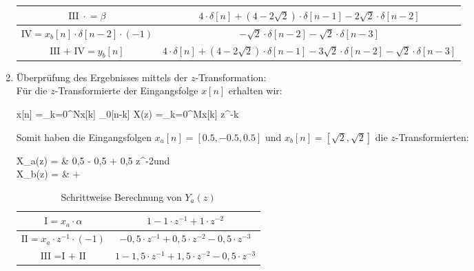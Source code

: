 \begin{enumerate}[label=\alph*)]
\begin{table}[H]
\begin{tabular}{|c|c|}
			\hline
			\ccgray $\mathrm{III} \;\cdot\! =\beta$							& $4 \cdot \delta[n] + \left(4-2\sqrt{2}\right) \cdot \delta[n-1] - 2\sqrt{2} \cdot \delta[n-2]$ \\
			\hline
			\ccgray $\mathrm{IV} =x_b[n] \cdot \delta[n-2] \cdot{(-1)}$	& $- \sqrt{2} \cdot \delta[n-2] - \sqrt{2} \cdot \delta[n-3]$ \\
			\hline
			\ccgray $\textrm{III + IV} =y_b[n]$							& $4 \cdot \delta[n] + \left(4-2\sqrt{2}\right) \cdot \delta[n-1] -3\sqrt{2} \cdot \delta[n-2] - \sqrt{2} \cdot \delta[n-3]$ \\
			\hline
		\end{tabular}
	\end{table}
	
	\item Überprüfung des Ergebnisses mittels der $z$-Transformation:\\[1.5ex]
	Für die $z$-Transformierte der Eingangsfolge $x[n]$ erhalten wir:\\
	{
		\setlength{\abovedisplayskip}{0pt}
		\setlength{\belowdisplayskip}{6pt}
		\setlength{\abovedisplayshortskip}{0pt}
		\setlength{\belowdisplayshortskip}{0pt}
		\begin{flalign*}
			x[n] =\sum_{k=0}^{N}{x[k] \cdot \delta_0[n-k]} \Leftrightarrow X(z) =\sum_{k=0}^{M}{x[k] \cdot z^{-k}}
		\end{flalign*}
	}
	Somit haben die Eingangsfolgen $x_a[n] =[0.5, -0.5, 0.5]$ und $x_b[n] =[\sqrt{2}, \sqrt{2}]$ die $z$-Transformierten:\\
	{
		\setlength{\abovedisplayskip}{0pt}
		\setlength{\belowdisplayskip}{6pt}
		\setlength{\abovedisplayshortskip}{0pt}
		\setlength{\belowdisplayshortskip}{0pt}
		\begin{flalign*}
			X_a(z) = & 0,5  - 0,5  + 0,5 \cdot z^{-2}\quad\textrm{und}\\
			X_b(z) = &   +  \cdot{z^{-1}}
		\end{flalign*}
	}
	\begin{table}[H]
		\centering
		\caption{Schrittweise Berechnung von $Y_a(z)$}
		\begin{tabular}{|c|c|}
			\hline
			\ccgray $\mathrm{I} =x_a \cdot \alpha$				& $1 - 1  + 1 \cdot{z^{-2}}$ \\
			\hline
			\ccgray $\mathrm{II} =x_a \cdot{z^{-1}} \cdot{(-1)}$	& $-0,5 \cdot{z^{-1}} + 0,5 \cdot{z^{-2}} - 0,5 \cdot{z^{-3}}$ \\
			\hline
			\ccgray $\textrm{III =I + II}$						& $1 - 1,5 \cdot{z^{-1}} + 1,5 \cdot{z^{-2}} - 0,5 \cdot{z^{-3}}$ \\

\end{tabular}
\end{table}
\end{enumerate}

